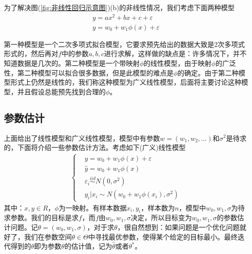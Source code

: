         为了解决图(\ref{fig:非线性回归示意图})(b)的非线性情况，我们考虑下面两种模型
        \begin{align*}
        y = ax^2+bx+c + \varepsilon\\
        y = w_0+w_1\phi(x) +\varepsilon
        \end{align*}
        \par
        第一种模型是一个二次多项式拟合模型，它要求预先给出的数据大致是2次多项式形式的，然后再对$f$中的参数$a,b,c$进行求解，这样做的缺点是：许多情况下，并不知道数据是几次的。第二种模型是一个带映射$\phi$的线性模型，由于映射$\phi$的广泛性，第二种模型可以拟合很多数据，但是此模型的难点是$\phi$的确定。由于第二种模型形式上仍然是线性的，我们称这种模型为广义线性模型，后面将主要讨论这种模型，并且假设总能预先找到合理的$\phi$。
    \subsection{参数估计}
        \par
        上面给出了线性模型和广义线性模型，模型中有参数$w = (w_1,w_2,\dots)$和$\sigma^2$是待求的，下面将介绍一些参数估计方法。考虑如下(广义)线性模型
        \begin{align}
        \label{二维广义线性模型}
        \left\{
        \begin{aligned}
        &y = w_0+w_1\phi(x)+\varepsilon \\
        &\hat{y} = w_0+w_1\phi(x)\\
        &\varepsilon_i\overset{iid}{\sim} N(0,\sigma^2)\\
        &y_i|x_i \sim N(w_0+w_1\phi(x_i),\sigma^2)
        \end{aligned}
        \right.
        \end{align}
        其中：$x,y \in R$，$\phi$为一映射。有样本数据$x_i,y_i$，样本数为$n$，模型中$w_0,w_1,\sigma$为待求参数。我们的目标是求$f$，而$f$由$w_0,w_1,\sigma$决定，所以目标变为$w_0,w_1,\sigma$的参数估计问题。记$\theta = (w_0,w_1,\sigma)$，对于求$\theta$，很自然想到：如果问题是一个优化问题就好了，我们在参数空间$\theta\in \Theta$中寻找最优参数，使得某个给定的目标最小。最终迭代得到的$\theta$即为参数$\theta$的估计值，记为$\hat{\theta}$或者$\theta^*$。
